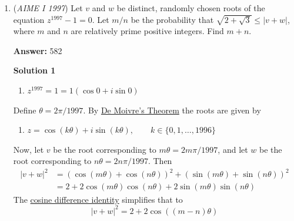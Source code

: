 \begin{enumerate}
 $\Big|\big| |x|-2\big|-1\Big|+\Big|\big| |y|-2\big|-1\Big|=1.$

  If a model of $S$ were built from wire of negligible thickness, then the total length of wire required would be $a\sqrt{b}$, where $a$ and $b$ are positive integers and $b$ is not divisible by the square of any prime number. Find $a+b$.


 
 \textbf{Answer: }066



\textbf{Solution 1 (non-rigorous)}

Let $f(x) = \Big|\big||x|-2\big|-1\Big|$, $f(x) \ge 0$. Then $f(x) + f(y) = 1 \Longrightarrow f(x), f(y) \le 1 \Longrightarrow x, y \le 4$. We only have a $4\times 4$ area, so guessing points and graphing won't be too bad of an idea. Since $f(x) = f(-x)$, there's a symmetry about all four \href{https://artofproblemsolving.com/wiki/index.php?title=Quadrant}{quadrants}, so just consider the first quadrant. We now gather some points:

 


	\item (\textit{AIME I 1997}) Let $v$ and $w$ be distinct, randomly chosen roots of the equation $z^{1997}-1=0$. Let $m/n$ be the probability that $\sqrt{2+\sqrt{3}}\le |v+w|$, where $m$ and $n$ are relatively prime positive integers. Find $m+n$.


 
 \textbf{Answer: }582



\textbf{Solution 1}


            \begin{enumerate}[label=(\roman*)]
                \item $z^{1997}=1=1(\cos 0 + i \sin 0)$
            \end{enumerate}
            Define $\theta = 2\pi/1997$. By \href{https://artofproblemsolving.com/wiki/index.php?title=De\_Moivre\%27s\_Theorem}{De Moivre's Theorem} the roots are given by

 
            \begin{enumerate}[label=(\roman*)]
                \item $z=\cos (k\theta) +i\sin(k\theta), \qquad k \in \{0,1,\ldots,1996\}$
            \end{enumerate}
            Now, let $v$ be the root corresponding to $m\theta=2m\pi/1997$, and let $w$ be the root corresponding to $n\theta=2n\pi/ 1997$. Then 
 \begin{align*} |v+w|^2 &= \left(\cos(m\theta) + \cos(n\theta)\right)^2 + \left(\sin(m\theta) + \sin(n\theta)\right)^2 \\ &= 2 + 2\cos\left(m\theta\right)\cos\left(n\theta\right) + 2\sin\left(m\theta\right)\sin\left(n\theta\right) \end{align*}
The \href{https://artofproblemsolving.com/wiki/index.php?title=Trigonometric\_identities}{cosine difference identity} simplifies that to
 \[|v+w|^2 = 2+2\cos((m-n)\theta)\]


\end{enumerate}
